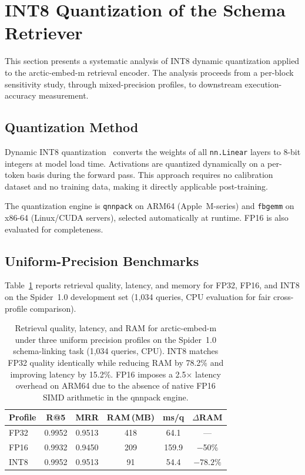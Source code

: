 \section{INT8 Quantization of the Schema Retriever}
\label{sec:quantization}

This section presents a systematic analysis of INT8 dynamic quantization
applied to the arctic-embed-m retrieval encoder.
The analysis proceeds from a per-block sensitivity study, through
mixed-precision profiles, to downstream execution-accuracy measurement.

\subsection{Quantization Method}

Dynamic INT8 quantization~\citep{jacob2018quantization} converts the weights
of all \texttt{nn.Linear} layers to 8-bit integers at model load time.
Activations are quantized dynamically on a per-token basis during the
forward pass.
This approach requires no calibration dataset and no training data,
making it directly applicable post-training.

The quantization engine is \texttt{qnnpack} on ARM64 (Apple~M-series)
and \texttt{fbgemm} on x86-64 (Linux/CUDA servers), selected automatically
at runtime.
FP16 is also evaluated for completeness.


\subsection{Uniform-Precision Benchmarks}

Table~\ref{tab:quant_uniform} reports retrieval quality, latency,
and memory for FP32, FP16, and INT8 on the Spider~1.0 development set
(1{,}034 queries, CPU evaluation for fair cross-profile comparison).

\begin{table}[!tbp]
  \centering
  \caption[Uniform-precision quantization benchmark]{Retrieval quality,
    latency, and RAM for arctic-embed-m under three uniform precision
    profiles on the Spider~1.0 schema-linking task (1{,}034 queries, CPU).
    INT8 matches FP32 quality identically while reducing RAM by 78.2\%
    and improving latency by 15.2\%.
    FP16 imposes a 2.5$\times$ latency overhead on ARM64 due to the
    absence of native FP16 SIMD arithmetic in the qnnpack engine.}
  \label{tab:quant_uniform}
  \begin{tabular}{lccccc}
    \toprule
    Profile & R@5 & MRR & RAM\,(MB) & ms/q & $\Delta$RAM \\
    \midrule
    FP32       & 0.9952 & 0.9513 & 418 & 64.1 & ---        \\
    FP16       & 0.9932 & 0.9450 & 209 & 159.9 & $-$50\%   \\
    INT8          & 0.9952          & 0.9513          & 91 & 54.4 & $-78.2\%$ \\
    \bottomrule
  \end{tabular}
\end{table}


